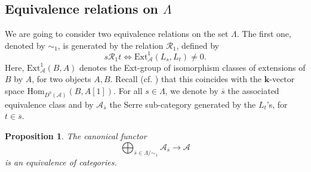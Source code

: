 \documentclass[11pt]{amsart}
\theoremstyle{plain}
\newtheorem{prop}[thm]{Proposition}
\theoremstyle{remark}
\numberwithin{equation}{section}
\begin{document}
	\subsection{Equivalence relations on $\Lambda$}\label{Equivalence relations on Lambda}
	We are going to consider two equivalence relations on the set $\Lambda$. The first one, denoted by $\sim_1$, is generated by the relation $\mathscr{R}_1$, defined by 
	$$s\mathscr{R}_1 t\Leftrightarrow \mathrm{Ext}_\mathcal{A}^1(L_s,L_t)\neq 0.$$
	Here, $\mathrm{Ext}_\mathcal{A}^1(B,A)$ denotes the Ext-group of isomorphism classes of extensions of $B$ by $A$, for two objects $A,B$. Recall (cf. \cite[Lemma 13.27.6]{stacks-project}) that this coincides with the $\mathbf{k}$-vector space $\mathrm{Hom}_{D^b(\mathcal{A})}(B,A[1])$. For all $s\in\Lambda$, we denote by  $\overline{s}$ the associated equivalence class and by $\mathcal{A}_{\overline{s}}$ the Serre sub-category generated by the $L_t$'s, for $t\in\overline{s}$.
	\begin{prop}
		The canonical functor $$\bigoplus_{\overline{s}\in\Lambda/\sim_1}\mathcal{A}_{\overline{s}}\to \mathcal{A}$$ is an equivalence of categories.
	\end{prop}
\end{document}
